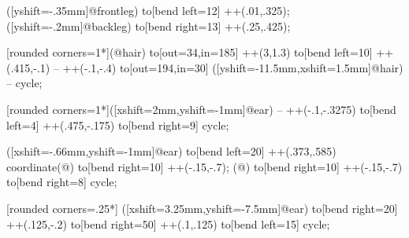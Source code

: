 { ([yshift=-.35mm]@frontleg) to[bend left=12] ++(.01,.325);
 ([yshift=-.2mm]@backleg) to[bend right=13] ++(.25,.425);

 [rounded corners=1*\pingu@@horse@scale](@hair) to[out=34,in=185] ++(3,1.3) to[bend left=10] ++(.415,-.1) -- ++(-.1,-.4) to[out=194,in=30] ([yshift=-11.5mm,xshift=1.5mm]@hair) -- cycle;

 [rounded corners=1*\pingu@@horse@scale]([xshift=2mm,yshift=-1mm]@ear) -- ++(-.1,-.3275) to[bend left=4] ++(.475,-.175) to[bend right=9] cycle;

 ([xshift=-.66mm,yshift=-1mm]@ear) to[bend left=20] ++(.373,.585) coordinate(@) to[bend right=10] ++(-.15,-.7);
 (@) to[bend right=10] ++(-.15,-.7) to[bend right=8] cycle;


 [rounded corners=.25*\pingu@@horse@scale] ([xshift=3.25mm,yshift=-7.5mm]@ear) to[bend right=20] ++(.125,-.2) to[bend right=50] ++(.1,.125) to[bend left=15] cycle;
}


\def\pingu@draw@wi@horse#1{%
    \pingu@setup@wing{horse}{#1}%
\scope[scale=\pingu@@horse@scale,every path/.append style={line cap=rond, line join=round},shift=(\pingu@name-wing-#1),rotate around={\@angle-5:(\pingu@name-wing-#1)}]
    \if@pingu@wing@item@side@left@
\scope[xshift=-4cm,yshift=-42mm]
\else
\scope[xshift=4cm,yshift=-42mm,xscale=-1]
\fi
    \pingu@@drawer@horse
\endscope\endscope
}